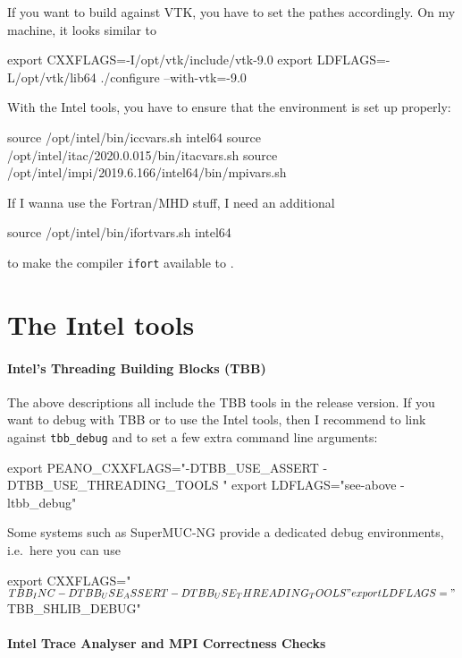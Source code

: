 If you want to build against VTK, you have to set the pathes accordingly. 
On my machine, it looks similar to
\begin{code}
 export CXXFLAGS=-I/opt/vtk/include/vtk-9.0
 export LDFLAGS=-L/opt/vtk/lib64
 ./configure --with-vtk=-9.0
\end{code}


With the Intel tools, you have to ensure that the environment is set up 
properly:
\begin{code}
source /opt/intel/bin/iccvars.sh intel64
source /opt/intel/itac/2020.0.015/bin/itacvars.sh
source /opt/intel/impi/2019.6.166/intel64/bin/mpivars.sh
\end{code}
\label{label:supercomputer:Intel-scripts}


If I wanna use the Fortran/MHD stuff, I need an additional
\begin{code}
source /opt/intel/bin/ifortvars.sh intel64
\end{code}
to make the compiler \texttt{ifort} available to \Peano.


\section{The Intel tools}
\label{section:supercomputers:IntelTools}

\paragraph{Intel's Threading Building Blocks (TBB)}

The above descriptions all include the TBB tools in the release version.
If you want to debug with TBB or to use the Intel tools, then I recommend to
link against \texttt{tbb\_debug} and to set a few extra command line arguments:

\begin{code}
 export PEANO_CXXFLAGS="-DTBB_USE_ASSERT -DTBB_USE_THREADING_TOOLS "
 export LDFLAGS="see-above   -ltbb_debug"
\end{code}

\noindent
Some systems such as SuperMUC-NG provide a dedicated debug environments,
i.e.~here you can use
\begin{code}
 export CXXFLAGS="$TBB_INC -DTBB_USE_ASSERT -DTBB_USE_THREADING_TOOLS "
 export LDFLAGS="$TBB_SHLIB_DEBUG"
\end{code}


\paragraph{Intel Trace Analyser and MPI Correctness Checks}

